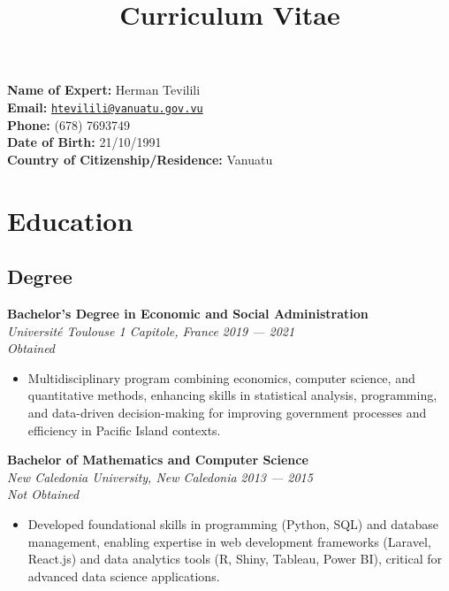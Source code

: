 \documentclass[
  letterpaper,
  DIV=11,
  numbers=noendperiod]{scrartcl}
\title{Curriculum Vitae}
\author{}
\date{}
\providecommand{\tightlist}{%
  \setlength{\itemsep}{0pt}\setlength{\parskip}{0pt}}
\begin{document}
\maketitle


\textbf{Name of Expert:} Herman Tevilili\\
\textbf{Email:}
\href{mailto:htevilili@vanuatu.gov.vu}{\nolinkurl{htevilili@vanuatu.gov.vu}}\\
\textbf{Phone:} (678) 7693749\\
\textbf{Date of Birth:} 21/10/1991\\
\textbf{Country of Citizenship/Residence:} Vanuatu

\section{Education}\label{education}

\subsection{Degree}\label{degree}

\textbf{Bachelor's Degree in Economic and Social Administration}\\
\emph{Université Toulouse 1 Capitole, France} {\emph{2019 --- 2021}}\\
\emph{Obtained}

\begin{itemize}
\tightlist
\item
  Multidisciplinary program combining economics, computer science, and
  quantitative methods, enhancing skills in statistical analysis,
  programming, and data-driven decision-making for improving government
  processes and efficiency in Pacific Island contexts.
\end{itemize}

\textbf{Bachelor of Mathematics and Computer Science}\\
\emph{New Caledonia University, New Caledonia} {\emph{2013 --- 2015}}\\
\emph{Not Obtained}\\

\begin{itemize}
\tightlist
\item
  Developed foundational skills in programming (Python, SQL) and
  database management, enabling expertise in web development frameworks
  (Laravel, React.js) and data analytics tools (R, Shiny, Tableau, Power
  BI), critical for advanced data science applications.
\end{itemize}
\end{document}
